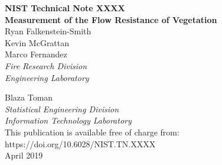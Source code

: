 \documentclass[12pt]{article}
\newcommand{\pubnumber}{XXXX}
\newcommand{\DOI}{https://doi.org/10.6028/NIST.TN.XXXX}
\newcommand{\monthyear}{April 2019}
\begin{document}
\newpage

\hspace{5in}

\newpage

\begin{titlepage}
\begin{flushright}
\LARGE{\textbf{NIST Technical Note \pubnumber}}\\
\vfill
\Huge{\textbf{Measurement of the Flow Resistance of Vegetation}}\\
\vfill
\normalsize Ryan Falkenstein-Smith\\
Kevin McGrattan\\
Marco Fernandez\\
\textit{Fire Research Division}\\
\textit{Engineering Laboratory}\\
\vspace{12pt}

\normalsize Blaza Toman\\
\textit{Statistical Engineering Division}\\
\textit{Information Technology Laboratory}\\
\vspace{12pt}
\vfill
\normalsize This publication is available free of charge from:\\
\DOI\\
\vfill
\normalsize \monthyear
\vfill


\end{flushright}
\end{titlepage}
\end{document}
